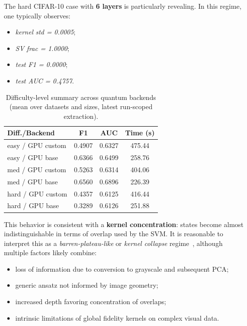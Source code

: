 \documentclass[10pt,twocolumn,letterpaper]{article}
\begin{document}
The hard CIFAR-10 case with \textbf{6 layers} is particularly revealing. In this regime, one typically observes:
\begin{itemize}
    \item \textit{kernel std = 0.0005};
    \item \textit{SV frac = 1.0000};
    \item \textit{test F1 = 0.0000};
    \item \textit{test AUC = 0.4757}.
\end{itemize}

\begin{table}[t]
\centering
\caption{Difficulty-level summary across quantum backends (mean over datasets and sizes, latest run-scoped extraction).}
\label{tab:failure-difficulty}
\scriptsize
\setlength{\tabcolsep}{3pt}
\begin{tabular}{lccc}
\toprule
\textbf{Diff./Backend} & \textbf{F1} & \textbf{AUC} & \textbf{Time (s)} \\
\midrule
easy / GPU custom & 0.4907 & 0.6327 & 475.44 \\
easy / GPU base   & 0.6366 & 0.6499 & 258.76 \\
med / GPU custom  & 0.5263 & 0.6314 & 404.06 \\
med / GPU base    & 0.6560 & 0.6896 & 226.39 \\
hard / GPU custom & 0.4357 & 0.6125 & 416.44 \\
hard / GPU base   & 0.3289 & 0.6126 & 251.88 \\
\bottomrule
\end{tabular}
\end{table}

This behavior is consistent with a \textbf{kernel concentration}: states become almost indistinguishable in terms 
of overlap used by the SVM. It is reasonable to interpret this as a \emph{barren-plateau-like} or 
\emph{kernel collapse} regime~\cite{larocca2024review,thanasilp2022exponential}, 
although multiple factors likely combine:
\begin{itemize}
    \item loss of information due to conversion to grayscale and subsequent PCA;
    \item generic ansatz not informed by image geometry;
    \item increased depth favoring concentration of overlaps;
    \item intrinsic limitations of global fidelity kernels on complex visual data.
\end{itemize}
\end{document}
